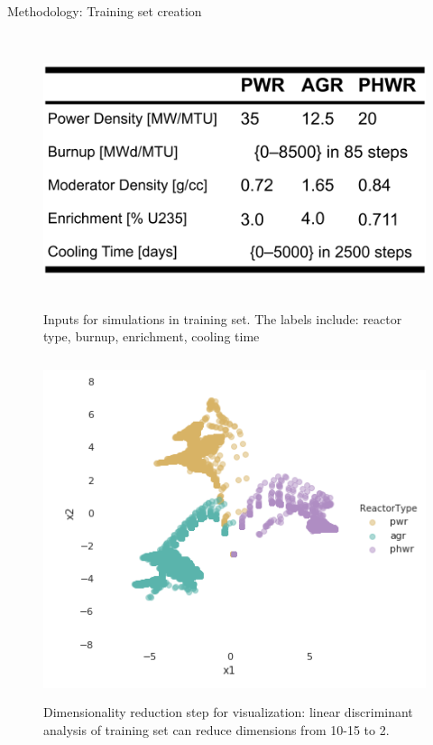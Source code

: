 \documentclass{beamer}
\begin{document}
\begin{frame}[t]{}
\begin{columns}
\begin{column}[T]{0.72\textwidth}
\begin{columns}[t]
\begin{column}{0.4\textwidth}
\begin{block}{Methodology: Training set creation}
\begin{minipage}{0.55\textwidth}
\begin{figure}
  \includegraphics[height=8cm]{figures/mlecompare_inputs.png}
  \caption{Inputs for simulations in training set. The labels include: 
           reactor type, burnup, enrichment, cooling time}
\end{figure}
\end{minipage}%
\begin{minipage}{0.45\textwidth}
\begin{figure}
  \includegraphics[height=10cm]{figures/lda-trainset.png}
  \caption{Dimensionality reduction step for visualization: 
           linear discriminant analysis of training set can reduce dimensions from 10-15 to 2.}
\end{figure}
\end{minipage}


\end{block}
\end{column}
\end{columns}
\end{column}
\end{columns}
\end{frame}
\end{document}
